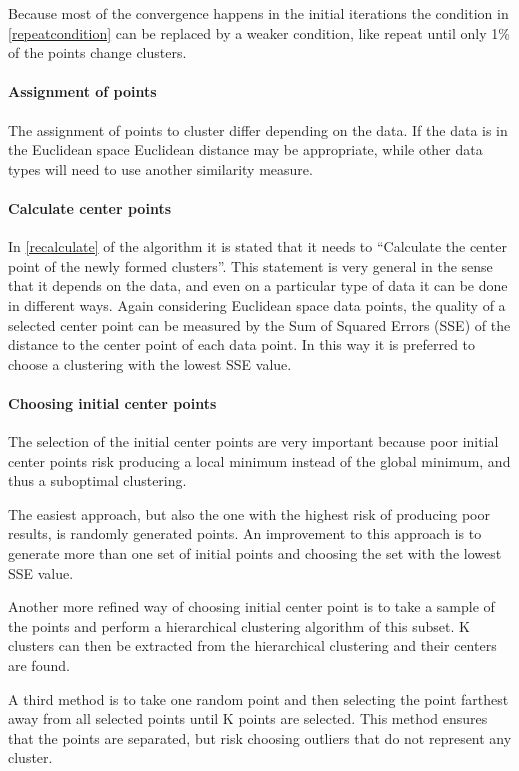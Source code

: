 Because most of the convergence happens in the initial iterations the condition in \cref{repeatcondition} can be replaced by a weaker condition, like repeat until only 1\% of the points change clusters.

\paragraph{Assignment of points} The assignment of points to cluster differ depending on the data.
If the data is in the Euclidean space Euclidean distance may be appropriate, while other data types will need to use another similarity measure.

\paragraph{Calculate center points} In \cref{recalculate} of the algorithm it is stated that it needs to ``Calculate the center point of the newly formed clusters''. 
This statement is very general in the sense that it depends on the data, and even on a particular type of data it can be done in different ways.
Again considering Euclidean space data points, the quality of a selected center point can be measured by the Sum of Squared Errors (SSE) of the distance to the center point of each data point.
In this way it is preferred to choose a clustering with the lowest SSE value.

\paragraph{Choosing initial center points}
The selection of the initial center points are very important because poor initial center points risk producing a local minimum instead of the global minimum, and thus a suboptimal clustering.

The easiest approach, but also the one with the highest risk of producing poor results, is randomly generated points. 
An improvement to this approach is to generate more than one set of initial points and choosing the set with the lowest SSE value. 

Another more refined way of choosing initial center point is to take a sample of the points and perform a hierarchical clustering algorithm of this subset.
K clusters can then be extracted from the hierarchical clustering and their centers are found.

A third method is to take one random point and then selecting the point farthest away from all selected points until K points are selected.
This method ensures that the points are separated, but risk choosing outliers that do not represent any cluster.

